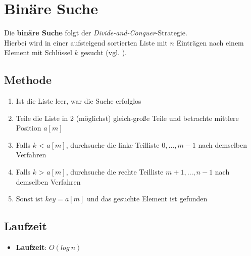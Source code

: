 \section{Binäre Suche}

Die \textbf{binäre Suche} folgt der \textit{Divide-and-Conquer}-Strategie.\\
Hierbei wird in einer aufsteigend sortierten Liste mit $n$ Einträgen nach einem Element mit Schlüssel $k$ gesucht (vgl. \cite[174 f.]{OW17c}).\\

\subsection{Methode}
\begin{enumerate}
    \item Ist die Liste leer, war die Suche erfolglos
    \item Teile die Liste in 2 (möglichst) gleich-große Teile und betrachte mittlere Position $a[m]$
    \item Falls $k$ < $a[m]$, durchsuche die linke Teilliste $0,\ldots, m-1$ nach demselben Verfahren
    \item Falls $k$ > $a[m]$, durchsuche die rechte Teilliste $m+1,\ldots, n-1$ nach demselben Verfahren
    \item Sonst ist $key = a[m]$ und das gesuchte Element ist gefunden
\end{enumerate}



\subsection{Laufzeit}
\begin{itemize}
    \item \textbf{Laufzeit}: $O(log\ n)$
\end{itemize}